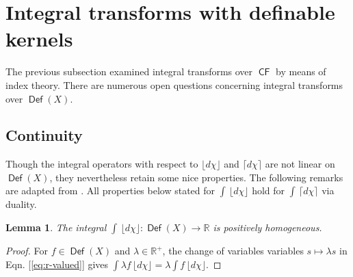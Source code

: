 \documentclass{psapm-l}
\newtheorem{lemma}[theorem]{Lemma}
\theoremstyle{definition}
\theoremstyle{remark}
\numberwithin{equation}{section}
\begin{document}
\section{Integral transforms with definable kernels}
\label{sec:defker}

The previous subsection examined integral transforms over ${{{\operatorname{\mathsf{{CF}}}}}}$ by means of index theory. There are numerous open questions concerning integral transforms over ${{{\operatorname{\mathsf{{Def}}}}}}(X)$.

\subsection{Continuity}
\label{sec:cont}

Though the integral operators with respect to ${{\lfloor d\chi\rfloor}}$ and ${{\lceil d\chi\rceil}}$ are not linear on ${{{\operatorname{\mathsf{{Def}}}}}}(X)$, they nevertheless retain some nice properties. The following remarks are adapted from \cite{BG:PNAS}. All properties below stated for $\int\,{{\lfloor d\chi\rfloor}}$ hold for $\int\,{{\lceil d\chi\rceil}}$ via duality.

\begin{lemma}
\label{lem:homog}
The integral $\int\,{{\lfloor d\chi\rfloor}}\colon{{{\operatorname{\mathsf{{Def}}}}}}(X)\to{{\mathbb R}}$ is positively homogeneous.
\end{lemma}
\begin{proof}
For $f\in {{{\operatorname{\mathsf{{Def}}}}}}(X)$ and $\lambda\in{{\mathbb R}}^+$, the change of variables variables $s\mapsto \lambda s$ in Eqn. [\ref{eq:r-valued}] gives $\int\lambda f\,{{\lfloor d\chi\rfloor}} = \lambda\int f\,{{\lfloor d\chi\rfloor}}$.
\end{proof}
\end{document}
